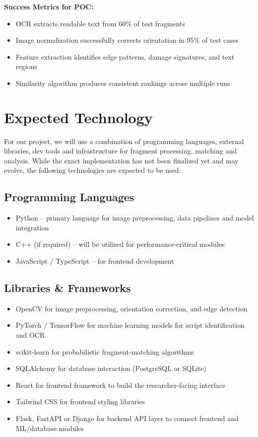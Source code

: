 \documentclass{article}
\begin{document}
\textbf{Success Metrics for POC:}
\begin{itemize}
\item OCR extracts readable text from 60\% of test fragments
\item Image normalization successfully corrects orientation in 95\% of test cases
\item Feature extraction identifies edge patterns, damage signatures, and text regions
\item Similarity algorithm produces consistent rankings across multiple runs
\end{itemize}

\section{Expected Technology}

\noindent For our project, we will use a combination of programming languages, external libraries, dev tools and infrastructure for fragment processing, matching and analysis. While the exact implementation has not been finalized yet and may evolve, the following technologies are expected to be used:

\subsection*{Programming Languages}
\begin{itemize}
    \item Python -- primary language for image preprocessing, data pipelines and model integration
    \item C++ (if required) -- will be utilized for performance-critical modules
    \item JavaScript / TypeScript -- for frontend development
\end{itemize}

\subsection*{Libraries \& Frameworks}
\begin{itemize}
    \item OpenCV for image preprocessing, orientation correction, and edge detection
    \item PyTorch / TensorFlow for machine learning models for script identification and OCR
    \item scikit-learn for probabilistic fragment-matching algorithms
    \item SQLAlchemy for database interaction (PostgreSQL or SQLite)
    \item React for frontend framework to build the researcher-facing interface
    \item Tailwind CSS for frontend styling libraries
    \item Flask, FastAPI or Django for backend API layer to connect frontend and ML/database modules
\end{itemize}
\end{document}
